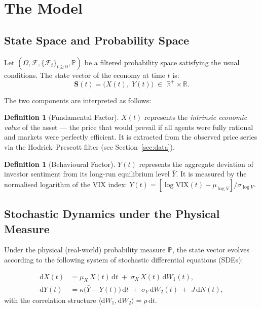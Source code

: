 \documentclass[12pt,a4paper]{article}
\theoremstyle{definition}
\newtheorem{definition}[theorem]{Definition}
\theoremstyle{remark}
\newcommand{\R}{\mathbb{R}}
\newcommand{\Prob}{\mathbb{P}}
\newcommand{\F}{\mathcal{F}}
\newcommand{\dd}{\mathrm{d}}
\begin{document}
\section{The Model}
\label{sec:model}

\subsection{State Space and Probability Space}

Let $(\Omega, \F, \{\F_t\}_{t \geq 0}, \Prob)$ be a filtered probability
space satisfying the usual conditions. The state vector of the economy
at time $t$ is:
\begin{equation}
  \mathbf{S}(t) = \bigl(X(t),\; Y(t)\bigr) \;\in\; \R^+ \times \R.
\end{equation}

The two components are interpreted as follows:

\begin{definition}[Fundamental Factor]
  $X(t)$ represents the \emph{intrinsic economic value} of the asset ---
  the price that would prevail if all agents were fully rational and
  markets were perfectly efficient. It is extracted from the observed
  price series via the Hodrick--Prescott filter (see
  Section~\ref{sec:data}).
\end{definition}

\begin{definition}[Behavioural Factor]
  $Y(t)$ represents the aggregate deviation of investor sentiment from
  its long-run equilibrium level $\bar{Y}$. It is measured by the
  normalised logarithm of the VIX index: $Y(t) =
  [\log\mathrm{VIX}(t) - \mu_{\log V}] / \sigma_{\log V}$.
\end{definition}

\subsection{Stochastic Dynamics under the Physical Measure}

Under the physical (real-world) probability measure $\Prob$, the state
vector evolves according to the following system of stochastic
differential equations (SDEs):

\begin{zewubox}[System of SDEs under $\Prob$]
\begin{align}
  \dd X(t) &= \mu_X \, X(t)\,\dd t \;+\; \sigma_X\, X(t)\,\dd W_1(t),
  \label{eq:sde_X} \\[6pt]
  \dd Y(t) &= \kappa\bigl(\bar{Y} - Y(t)\bigr)\,\dd t \;+\;
              \sigma_Y\,\dd W_2(t) \;+\; J\,\dd N(t),
  \label{eq:sde_Y}
\end{align}
with the correlation structure $\langle \dd W_1, \dd W_2 \rangle = \rho\,\dd t$.
\end{zewubox}
\end{document}
